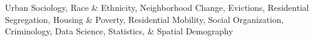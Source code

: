 

\begin{cvparagraph}

Urban Sociology, Race \& Ethnicity, Neighborhood Change, Evictions, Residential Segregation, Housing \& Poverty, Residential Mobility, Social Organization, Criminology, Data Science, Statistics, \& Spatial Demography
\end{cvparagraph}
